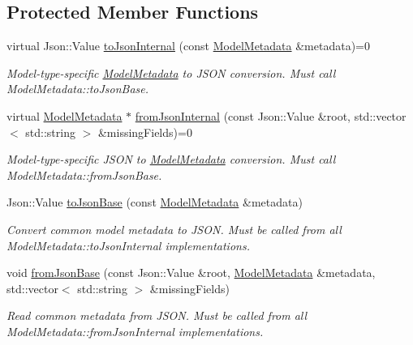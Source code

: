 \subsection*{Protected Member Functions}
\begin{DoxyCompactItemize}
\item 
virtual Json\+::\+Value \hyperlink{classdg_1_1deepcore_1_1classification_1_1_model_metadata_json_a64da517601cb67872352a34e8b804c15}{to\+Json\+Internal} (const \hyperlink{classdg_1_1deepcore_1_1classification_1_1_model_metadata}{Model\+Metadata} \&metadata)=0
\begin{DoxyCompactList}\small\item\em Model-\/type-\/specific \hyperlink{classdg_1_1deepcore_1_1classification_1_1_model_metadata}{Model\+Metadata} to J\+S\+ON conversion. Must call Model\+Metadata\+::to\+Json\+Base. \end{DoxyCompactList}\item 
virtual \hyperlink{classdg_1_1deepcore_1_1classification_1_1_model_metadata}{Model\+Metadata} $\ast$ \hyperlink{classdg_1_1deepcore_1_1classification_1_1_model_metadata_json_a7193c5debd5f94777159a77fb82e9225}{from\+Json\+Internal} (const Json\+::\+Value \&root, std\+::vector$<$ std\+::string $>$ \&missing\+Fields)=0
\begin{DoxyCompactList}\small\item\em Model-\/type-\/specific J\+S\+ON to \hyperlink{classdg_1_1deepcore_1_1classification_1_1_model_metadata}{Model\+Metadata} conversion. Must call Model\+Metadata\+::from\+Json\+Base. \end{DoxyCompactList}\item 
Json\+::\+Value \hyperlink{group___classification_module_ga5736fbf7a78314a0f6a86bf49c1ec55f}{to\+Json\+Base} (const \hyperlink{classdg_1_1deepcore_1_1classification_1_1_model_metadata}{Model\+Metadata} \&metadata)
\begin{DoxyCompactList}\small\item\em Convert common model metadata to J\+S\+ON. Must be called from all Model\+Metadata\+::to\+Json\+Internal implementations. \end{DoxyCompactList}\item 
void \hyperlink{group___classification_module_ga7ebc89c602cc78bcb33689ee37edffac}{from\+Json\+Base} (const Json\+::\+Value \&root, \hyperlink{classdg_1_1deepcore_1_1classification_1_1_model_metadata}{Model\+Metadata} \&metadata, std\+::vector$<$ std\+::string $>$ \&missing\+Fields)
\begin{DoxyCompactList}\small\item\em Read common metadata from J\+S\+ON. Must be called from all Model\+Metadata\+::from\+Json\+Internal implementations. \end{DoxyCompactList}\end{DoxyCompactItemize}


